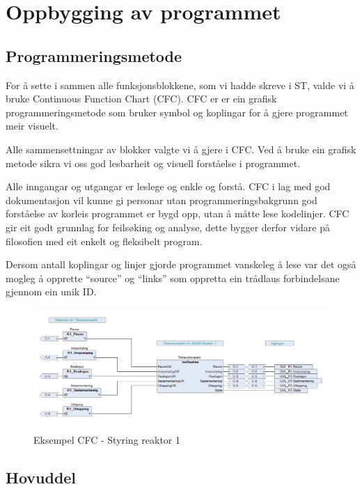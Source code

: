 \newpage
\section{Oppbygging av programmet}
\thispagestyle{fancy}

\subsection{Programmeringsmetode}
For å sette i sammen alle funksjonsblokkene, som vi hadde skreve i \gls{ST}, valde vi å bruke  Continuous Function Chart (\gls{CFC}).
\gls{CFC} er er ein grafisk programmeringsmetode som bruker symbol og koplingar for å gjere programmet  meir visuelt.

Alle sammensettningar av blokker valgte vi å gjere i \gls{CFC}. Ved å bruke ein grafisk metode sikra vi oss god lesbarheit og
visuell forståelse i programmet. 

Alle inngangar og utgangar er leslege og enkle og forstå. \gls{CFC} i lag med god dokumentasjon vil kunne gi personar utan programmeringsbakgrunn
god forståelse av korleis programmet er bygd opp, utan å måtte lese kodelinjer.
\gls{CFC} gir eit godt grunnlag for feilsøking og analyse, dette bygger derfor vidare på filosofien med eit enkelt og fleksibelt program.

Dersom antall koplingar og linjer gjorde programmet vanskeleg å lese var det også
mogleg å opprette ``source'' og ``links'' som oppretta ein trådlaus forbindelsane gjennom ein unik ID.

\begin{figure}[htbp]
    \centering
    \includegraphics[width=1\textwidth]{Bilder/ReaktorPRG.png}
    \caption{Eksempel \gls{CFC} - Styring reaktor 1}\label{fig:CFCReaktor}
\end{figure}

\newpage

\subsection{Hovuddel}

